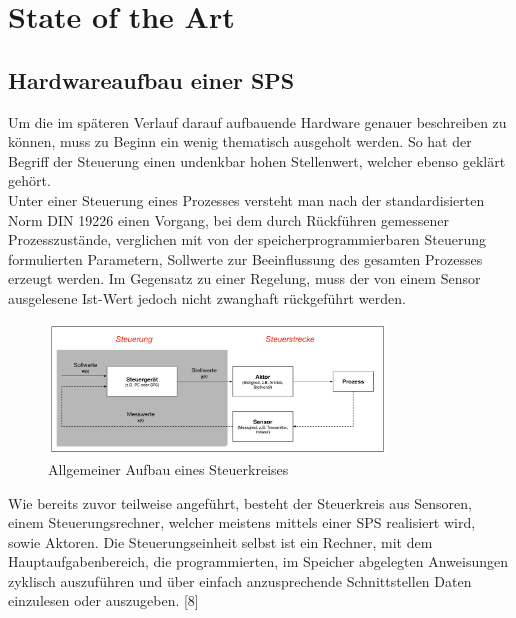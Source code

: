
\chapter{State of the Art} \label{chapter:stateoftheart}

	\section{Hardwareaufbau einer SPS}
	
	Um die im späteren Verlauf darauf aufbauende Hardware genauer beschreiben zu können, muss zu Beginn ein wenig thematisch ausgeholt werden. So hat der Begriff der Steuerung einen undenkbar hohen Stellenwert, welcher ebenso geklärt gehört.\\
	
	Unter einer Steuerung eines Prozesses versteht man nach der standardisierten Norm DIN 19226 einen Vorgang, bei dem durch Rückführen gemessener Prozesszustände, verglichen mit von der speicherprogrammierbaren Steuerung formulierten Parametern, Sollwerte zur Beeinflussung des gesamten Prozesses erzeugt werden. Im Gegensatz zu einer Regelung, muss der von einem Sensor ausgelesene Ist-Wert jedoch nicht zwanghaft rückgeführt werden.\\
	
	\begin{figure}[h!]
  		\centering
      	\includegraphics[width=0.8\textwidth]{graphics/stateoftheart/Aufbau_Steuerkreis_Selfmade.png}
  		\caption{Allgemeiner Aufbau eines Steuerkreises}
	\end{figure}	

	
	Wie bereits zuvor teilweise angeführt, besteht der Steuerkreis aus Sensoren, einem Steuerungsrechner, welcher meistens mittels einer SPS realisiert wird, sowie Aktoren. Die Steuerungseinheit selbst ist ein Rechner, mit dem Hauptaufgabenbereich, die programmierten, im Speicher abgelegten Anweisungen zyklisch auszuführen und über einfach anzusprechende Schnittstellen Daten einzulesen oder auszugeben. [8]\\
	
